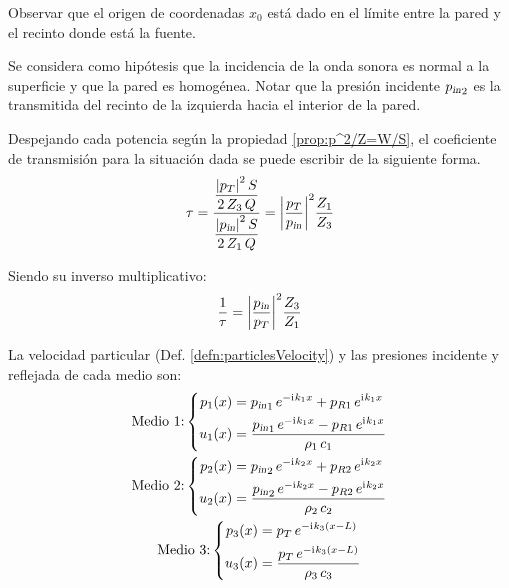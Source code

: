 \documentclass[a5paper,12pt,twoside]{book}
\begin{document}
\begin{center}
    \def\svgwidth{0.7\linewidth}
    
\end{center}

Observar que el origen de coordenadas $x_0$ está dado en el límite entre la pared y el recinto donde está la fuente.

Se considera como hipótesis que la incidencia de la onda sonora es normal a la superficie y que la pared es homogénea. Notar que la presión incidente ${{p}_\textsl{{in}}}_2$ es la transmitida del recinto de la izquierda hacia el interior de la pared.

Despejando cada potencia según la propiedad \ref{prop:p^2/Z=W/S}, el coeficiente de transmisión para la situación dada se puede escribir de la siguiente forma.
\begin{equation*}
    \tau = \frac{\dfrac{{\left| {p_T} \right|}^2 \, S}{2\,Z_3\,Q}}{\dfrac{{\left| {{{p}_\textsl{{in}}}} \right|}^2 \, S}{2\,Z_1\,Q}}
    = {\left| {\frac{p_T}{{{p}_\textsl{{in}}}}} \right|}^2 \frac{Z_1}{Z_3}
\end{equation*}

Siendo su inverso multiplicativo:
\begin{equation}
    \frac{1}{\tau} = {\left| {\frac{{{p}_\textsl{{in}}}}{p_T}} \right|}^2 \frac{Z_3}{Z_1}
    \label{eqn:mediumTau}
\end{equation}

La velocidad particular (Def. \ref{defn:particlesVelocity}) y las presiones incidente y reflejada de cada medio son:
\begin{gather*}
    \text{Medio 1:}
    \left\{
    \begin{aligned}
        p_1(x) &= {{p}_\textsl{{in}}}_1 \, e^{-\mathrm{i}\mkern1mu k_1 x} + p_{R1} \, e^{\mathrm{i}\mkern1mu k_1 x}
        \\
        u_1(x) &= \frac{{{p}_\textsl{{in}}}_1 \, e^{-\mathrm{i}\mkern1mu k_1 x} - p_{R1} \, e^{\mathrm{i}\mkern1mu k_1 x}}{\rho_1 \, c_1}
    \end{aligned}
    \right.
    \\
    \text{Medio 2:}
    \left\{
    \begin{aligned}
        p_2(x) &= {{p}_\textsl{{in}}}_2 \, e^{-\mathrm{i}\mkern1mu k_2 x} + p_{R2} \, e^{\mathrm{i}\mkern1mu k_2 x}
        \\
        u_2(x) &= \frac{{{p}_\textsl{{in}}}_2 \, e^{-\mathrm{i}\mkern1mu k_2 x} - p_{R2} \, e^{\mathrm{i}\mkern1mu k_2 x}}{\rho_2 \, c_2}
    \end{aligned}
    \right.
    \\
    \text{Medio 3:}
    \left\{
    \begin{aligned}
        p_3(x) &= p_T \, e^{-\mathrm{i}\mkern1mu k_3 \left(x-L\right)}
        \\
        u_3(x) &= \frac{p_T \, e^{-\mathrm{i}\mkern1mu k_3 \left(x-L\right)}}{\rho_3 \, c_3}
    \end{aligned}
    \right.
\end{gather*}
\end{document}
